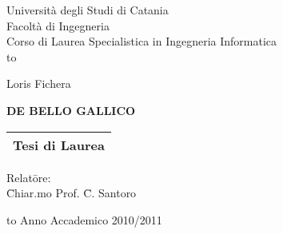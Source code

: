 \begin{titlepage}
\begin{center}
  {\Large \sc Universit\`a degli Studi di Catania}\\
  {\large \sc Facolt\`a di Ingegneria}\\
  {\sc Corso di Laurea Specialistica in Ingegneria Informatica}\\
  
  \hbox to \textwidth{\hrulefill}
  
  \vspace{1.8truecm}
  
  {\large \sc Loris Fichera}
  
  \vspace{1.8truecm}
  
  {\large\sc \uppercase{\textbf{De Bello Gallico}}} %
  
  \vspace{1.7truecm}
  
  \begin{tabular}{c}
    \hline
        {\sc Tesi di Laurea}\\
        \hline
  \end{tabular}

  \vspace{1.7truecm}
  
  \begin{minipage}{\textwidth}
    \begin{flushright}
      \begin{minipage}{0.3\textwidth}
        \begin{tabbing}
          Relat\=ore:\\
          \>  \=Chiar.mo Prof. \= {\sc C. Santoro}
        \end{tabbing}
      \end{minipage}
    \end{flushright}
  \end{minipage}
  
  
  \hbox to \textwidth{\hrulefill}
        {\sc Anno Accademico 2010/2011}        
\end{center}
\end{titlepage}

\endinput
